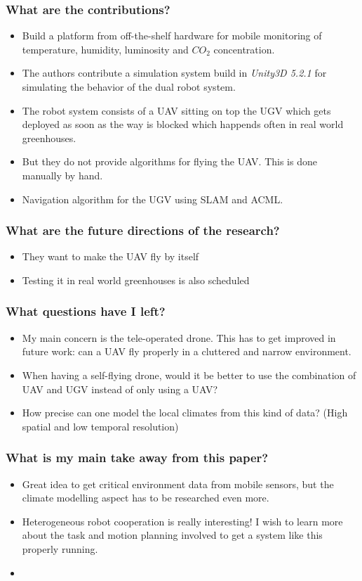 \subsubsection*{What are the contributions?}
\begin{itemize}
    \item Build a platform from off-the-shelf hardware for mobile monitoring of temperature, humidity, luminosity and $CO_2$ concentration.
    \item The authors contribute a simulation system build in \emph{Unity3D 5.2.1} for simulating the behavior of the dual robot system. 
    \item The robot system consists of a UAV sitting on top the UGV which gets deployed as soon as the way is blocked which happends often in real world greenhouses.
    \item But they do not provide algorithms for flying the UAV. This is done manually by hand.
    \item Navigation algorithm for the UGV using SLAM and ACML.
\end{itemize}
\subsubsection*{What are the future directions of the research?}
\begin{itemize}
    \item They want to make the UAV fly by itself
    \item Testing it in real world greenhouses is also scheduled
\end{itemize}
\subsubsection*{What questions have I left?}
\begin{itemize}
    \item My main concern is the tele-operated drone. This has to get improved in future work: can a UAV fly properly in a cluttered and narrow environment.
    \item When having a self-flying drone, would it be better to use the combination of UAV and UGV instead of only using a UAV?
    \item How precise can one model the local climates from this kind of data? (High spatial and low temporal resolution)
\end{itemize}
\subsubsection*{What is my main take away from this paper?}
\begin{itemize}
    \item Great idea to get critical environment data from mobile sensors, but the climate modelling aspect has to be researched even more.
    \item Heterogeneous robot cooperation is really interesting! I wish to learn more about the task and motion planning involved to get a system like this properly running.
    \item 
\end{itemize}

